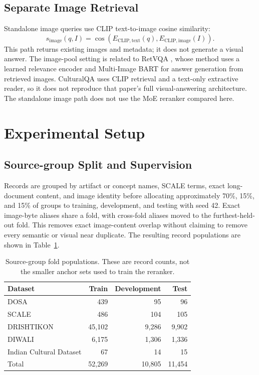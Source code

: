 \documentclass[10pt,a4paper]{article}
\begin{document}
\subsection{Separate Image Retrieval}
Standalone image queries use CLIP text-to-image cosine similarity:
\begin{equation}
s_{\mathrm{image}}(q,I)=\cos(E_{\mathrm{CLIP,text}}(q),E_{\mathrm{CLIP,image}}(I)).
\end{equation}
This path returns existing images and metadata; it does not generate a visual answer. The image-pool setting is related to RetVQA \cite{retvqa}, whose method uses a learned relevance encoder and Multi-Image BART for answer generation from retrieved images. CulturalQA uses CLIP retrieval and a text-only extractive reader, so it does not reproduce that paper's full visual-answering architecture. The standalone image path does not use the MoE reranker compared here.

\section{Experimental Setup}
\subsection{Source-group Split and Supervision}
Records are grouped by artifact or concept names, SCALE terms, exact long-document content, and image identity before allocating approximately 70\%, 15\%, and 15\% of groups to training, development, and testing with seed 42. Exact image-byte aliases share a fold, with cross-fold aliases moved to the furthest-held-out fold. This removes exact image-content overlap without claiming to remove every semantic or visual near duplicate. The resulting record populations are shown in Table~\ref{tab:split}.

\begin{table}[htbp]
\centering\small
\caption{Source-group fold populations. These are record counts, not the smaller anchor sets used to train the reranker.}
\label{tab:split}
\begin{tabular}{@{}lrrr@{}}
\toprule Dataset & Train & Development & Test\\\midrule
DOSA & 439 & 95 & 96\\
SCALE & 486 & 104 & 105\\
DRISHTIKON & 45,102 & 9,286 & 9,902\\
DIWALI & 6,175 & 1,306 & 1,336\\
Indian Cultural Dataset & 67 & 14 & 15\\\midrule
Total & 52,269 & 10,805 & 11,454\\\bottomrule
\end{tabular}
\end{table}
\end{document}
